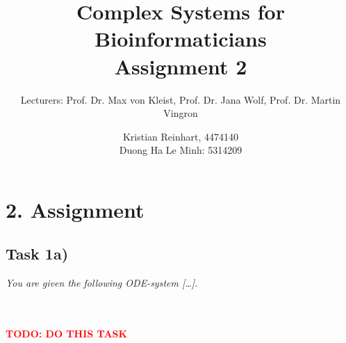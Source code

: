 \documentclass[]{scrartcl}
\title{Complex Systems for Bioinformaticians \\ \vspace{2mm} Assignment 2 \\ \vspace{2mm}}
\subtitle{Lecturers: Prof. Dr. Max von Kleist, Prof. Dr. Jana Wolf, Prof. Dr. Martin Vingron}
\author{Kristian Reinhart, 4474140 \\ Duong Ha Le Minh: 5314209}
\begin{document}
\maketitle




\section*{2. Assignment}

\subsection*{Task 1a)}

\textit{You are given the following ODE-system [\dots].}

\\
\\
\textbf{\textcolor{red}{TODO: DO THIS TASK}}

%
%
%
%
%
%
\end{document}
